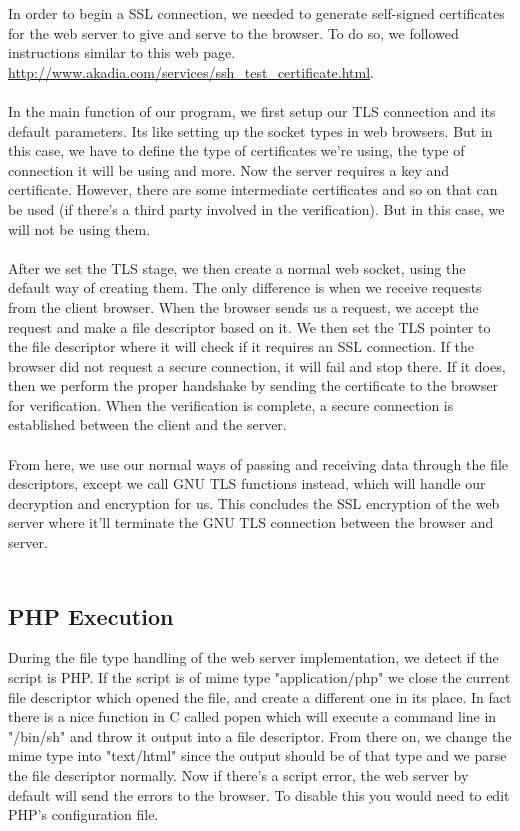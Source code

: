 \documentclass[a4paper,12pt]{article}
\begin{document}
In order to begin a SSL connection, we needed to generate self-signed
certificates for the web server to give and serve to the browser. To
do so, we followed instructions similar to this web page.
\url{http://www.akadia.com/services/ssh_test_certificate.html}.\\
\\
In the main function of our program, we first setup our TLS connection
and its default parameters. Its like setting up the socket types in 
web browsers. But in this case, we have to define the type of certificates
we're using, the type of connection it will be using and more. Now the server
requires a key and certificate. However, there are some intermediate 
certificates and so on that can be used (if there's a third party involved
in the verification). But in this case, we will not be using them.\\
\\
After we set the TLS stage, we then create a normal web socket,
using the default way of creating them. The only difference is when
we receive requests from the client browser. When the browser sends us
a request, we accept the request and make a file descriptor based on it.
We then set the TLS pointer to the file descriptor where it will check
if it requires an SSL connection. If the browser did not request a secure
connection, it will fail and stop there. If it does, then we perform the 
proper handshake by sending the certificate to the browser for verification.
When the verification is complete, a secure connection is established
between the client and the server.\\
\\
From here, we use our normal ways of passing and receiving data through
the file descriptors, except we call GNU TLS functions instead, which
will handle our decryption and encryption for us. This concludes
the SSL encryption of the web server where it'll terminate the GNU TLS
connection between the browser and server.\\
\\
\subsection{PHP Execution}

During the file type handling of the web server implementation, we
detect if the script is PHP. If the script is of mime type "application/php"
we close the current file descriptor which opened the file, and
create a different one in its place. In fact there is a nice function
in C called popen which will execute a command line in "/bin/sh" and
throw it output into a file descriptor. From there on, we change the 
mime type into "text/html" since the output should be of that type
and we parse the file descriptor normally. Now if there's a script error,
the web server by default will send the errors to the browser. To disable
this you would need to edit PHP's configuration file.\\
\\
\end{document}

